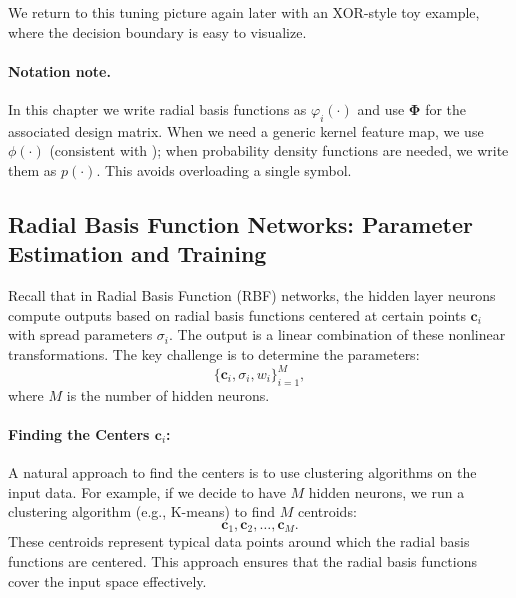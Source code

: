 We return to this tuning picture again later with an XOR-style toy example, where the decision boundary is easy to visualize.

\paragraph{Notation note.} In this chapter we write radial basis functions as \(\varphi_i(\cdot)\) and use \(\boldsymbol{\Phi}\) for the associated design matrix. When we need a generic kernel feature map, we use \(\phi(\cdot)\) (consistent with ); when probability density functions are needed, we write them as \(p(\cdot)\). This avoids overloading a single symbol.


\subsection{Radial Basis Function Networks: Parameter Estimation and Training}
\label{sec:rbf_radial_basis_function_networks_parameter_estimation_and_training}

Recall that in Radial Basis Function (RBF) networks, the hidden layer neurons compute outputs based on radial basis functions centered at certain points \( \mathbf{c}_i \) with spread parameters \( \sigma_i \). The output is a linear combination of these nonlinear transformations. The key challenge is to determine the parameters:
\[
\{ \mathbf{c}_i, \sigma_i, w_i \}_{i=1}^M,
\]
where \( M \) is the number of hidden neurons.

\paragraph{Finding the Centers \(\mathbf{c}_i\):}
A natural approach to find the centers is to use clustering algorithms on the input data. For example, if we decide to have \( M \) hidden neurons, we run a clustering algorithm (e.g., K-means) to find \( M \) centroids:
\[
\mathbf{c}_1, \mathbf{c}_2, \ldots, \mathbf{c}_M.
\]
These centroids represent typical data points around which the radial basis functions are centered. This approach ensures that the radial basis functions cover the input space effectively.

